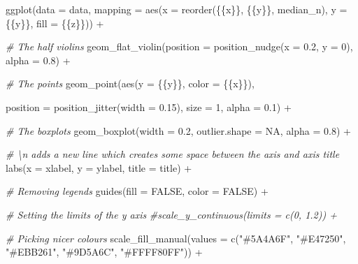 \documentclass[a4paper,nobind]{templates/ociamthesis}
\newenvironment{Shaded}{\begin{snugshade}}{\end{snugshade}}
\newcommand{\AttributeTok}[1]{\textcolor[rgb]{0.77,0.63,0.00}{#1}}
\newcommand{\CommentTok}[1]{\textcolor[rgb]{0.56,0.35,0.01}{\textit{#1}}}
\newcommand{\ConstantTok}[1]{\textcolor[rgb]{0.00,0.00,0.00}{#1}}
\newcommand{\DecValTok}[1]{\textcolor[rgb]{0.00,0.00,0.81}{#1}}
\newcommand{\FloatTok}[1]{\textcolor[rgb]{0.00,0.00,0.81}{#1}}
\newcommand{\FunctionTok}[1]{\textcolor[rgb]{0.00,0.00,0.00}{#1}}
\newcommand{\NormalTok}[1]{#1}
\newcommand{\SpecialCharTok}[1]{\textcolor[rgb]{0.00,0.00,0.00}{#1}}
\newcommand{\StringTok}[1]{\textcolor[rgb]{0.31,0.60,0.02}{#1}}
\renewenvironment{Shaded}
{
  \vspace{10pt}%
  \begin{snugshade}%
}{%
  \end{snugshade}%
  \vspace{8pt}%
}
\begin{document}
\begin{landscape}
\begin{Shaded}
\begin{Highlighting}[]
  \FunctionTok{ggplot}\NormalTok{(}\AttributeTok{data =}\NormalTok{ data, }
           \AttributeTok{mapping =} \FunctionTok{aes}\NormalTok{(}\AttributeTok{x =} \FunctionTok{reorder}\NormalTok{(\{\{x\}\}, \{\{y\}\}, median\_n), }\AttributeTok{y =}\NormalTok{ \{\{y\}\}, }\AttributeTok{fill =}\NormalTok{ \{\{z\}\})) }\SpecialCharTok{+}
    
    \CommentTok{\# The half violins}
    \FunctionTok{geom\_flat\_violin}\NormalTok{(}\AttributeTok{position =} \FunctionTok{position\_nudge}\NormalTok{(}\AttributeTok{x =} \FloatTok{0.2}\NormalTok{, }\AttributeTok{y =} \DecValTok{0}\NormalTok{), }\AttributeTok{alpha =} \FloatTok{0.8}\NormalTok{) }\SpecialCharTok{+}
    
    \CommentTok{\# The points}
    \FunctionTok{geom\_point}\NormalTok{(}\FunctionTok{aes}\NormalTok{(}\AttributeTok{y =}\NormalTok{ \{\{y\}\}, }\AttributeTok{color =}\NormalTok{ \{\{x\}\}), }
    
    \AttributeTok{position =} \FunctionTok{position\_jitter}\NormalTok{(}\AttributeTok{width =} \FloatTok{0.15}\NormalTok{), }\AttributeTok{size =} \DecValTok{1}\NormalTok{, }\AttributeTok{alpha =} \FloatTok{0.1}\NormalTok{) }\SpecialCharTok{+}
    
    \CommentTok{\# The boxplots}
    \FunctionTok{geom\_boxplot}\NormalTok{(}\AttributeTok{width =} \FloatTok{0.2}\NormalTok{, }\AttributeTok{outlier.shape =} \ConstantTok{NA}\NormalTok{, }\AttributeTok{alpha =} \FloatTok{0.8}\NormalTok{) }\SpecialCharTok{+}
    
    \CommentTok{\# \textbackslash{}n adds a new line which creates some space between the axis and axis title}
    \FunctionTok{labs}\NormalTok{(}\AttributeTok{x =}\NormalTok{ xlabel, }\AttributeTok{y =}\NormalTok{ ylabel, }\AttributeTok{title =}\NormalTok{ title) }\SpecialCharTok{+}
    
    \CommentTok{\# Removing legends}
    \FunctionTok{guides}\NormalTok{(}\AttributeTok{fill =} \ConstantTok{FALSE}\NormalTok{, }\AttributeTok{color =} \ConstantTok{FALSE}\NormalTok{) }\SpecialCharTok{+}
    
    \CommentTok{\# Setting the limits of the y axis}
    \CommentTok{\#scale\_y\_continuous(limits = c(0, 1.2)) +}
    
    \CommentTok{\# Picking nicer colours}
    \FunctionTok{scale\_fill\_manual}\NormalTok{(}\AttributeTok{values =} \FunctionTok{c}\NormalTok{(}\StringTok{"\#5A4A6F"}\NormalTok{, }\StringTok{"\#E47250"}\NormalTok{,  }\StringTok{"\#EBB261"}\NormalTok{, }\StringTok{"\#9D5A6C"}\NormalTok{, }\StringTok{"\#FFFF80FF"}\NormalTok{)) }\SpecialCharTok{+}
    

\end{Highlighting}
\end{Shaded}
\end{landscape}
\end{document}
